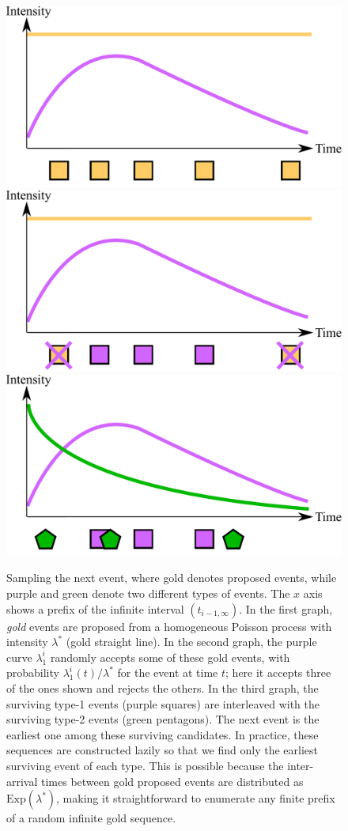 \documentclass{article}
\begin{document}
\begin{figure}
\includegraphics[width=0.32\linewidth]{./figures/thinning/1.pdf}
\includegraphics[width=0.32\linewidth]{./figures/thinning/2.pdf}
\includegraphics[width=0.32\linewidth]{./figures/thinning/3.pdf}
\caption{
Sampling the next event, where {gold} denotes proposed events, while purple and green denote two different types of events. The $x$ axis shows a prefix of the infinite interval $(t_{i-1,\infty})$.
In the first graph, {\em gold} events are proposed from a homogeneous Poisson process with intensity $\lambda^*$ (gold straight line). In the second graph, the purple curve $\lambda_1^i$ randomly accepts some of these gold events, with probability $\lambda_1^i(t) / \lambda^*$ for the event at time $t$; here it accepts three of the ones shown and rejects the others. In the third graph, the surviving type-1 events (purple squares) are interleaved with the surviving type-2 events (green pentagons). The next event is the earliest one among these surviving candidates.  In practice, these sequences are constructed lazily so that we find only the earliest surviving event of each type.  This is possible because the inter-arrival times between gold proposed events are distributed as $\text{Exp}(\lambda^*)$, making it straightforward to enumerate any finite prefix of a random infinite gold sequence.
}\label{fig:thinning}
\end{figure}
\end{document}

